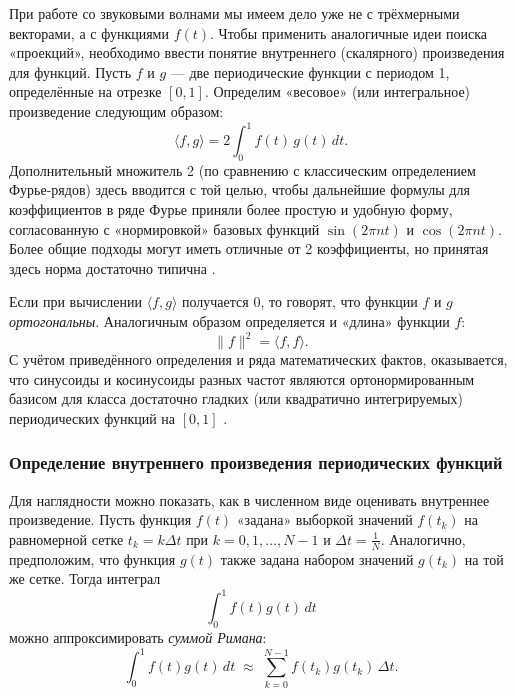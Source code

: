 \documentclass[bachelor, och, diploma]{SCWorks}
\begin{document}
При работе со звуковыми волнами мы имеем дело уже не с трёхмерными векторами, а с функциями \(f(t)\). Чтобы применить аналогичные идеи поиска «проекций», необходимо ввести понятие внутреннего (скалярного) произведения для функций. Пусть \(f\) и \(g\) — две периодические функции с периодом 1, определённые на отрезке \([0,1]\). Определим «весовое» (или интегральное) произведение следующим образом:
\[
\langle f, g \rangle = 2 \int_{0}^{1} f(t)\, g(t)\, dt.
\]
Дополнительный множитель 2 (по сравнению с классическим определением Фурье-рядов) здесь вводится с той целью, чтобы дальнейшие формулы для коэффициентов в ряде Фурье приняли более простую и удобную форму, согласованную с «нормировкой» базовых функций \(\sin(2\pi n t)\) и \(\cos(2\pi n t)\). Более общие подходы могут иметь отличные от 2 коэффициенты, но принятая здесь норма достаточно типична \cite{bracewell}.

Если при вычислении \(\langle f, g\rangle\) получается 0, то говорят, что функции \(f\) и \(g\) \textit{ортогональны}. Аналогичным образом определяется и «длина» функции \(f\):
\[
\| f\|^2 = \langle f, f\rangle.
\]
С учётом приведённого определения и ряда математических фактов, оказывается, что синусоиды и косинусоиды разных частот являются ортонормированным базисом для класса достаточно гладких (или квадратично интегрируемых) периодических функций на \([0,1]\) \cite{opp-sigsys}.

\subsubsection{Определение внутреннего произведения периодических функций}

Для наглядности можно показать, как в численном виде оценивать внутреннее произведение. Пусть функция \(f(t)\) «задана» выборкой значений \(f(t_k)\) на равномерной сетке \(t_k = k\Delta t\) при \(k = 0, 1, \ldots, N-1\) и \(\Delta t = \frac{1}{N}\). Аналогично, предположим, что функция \(g(t)\) также задана набором значений \(g(t_k)\) на той же сетке. Тогда интеграл
\[
\int_{0}^{1} f(t) g(t) \, dt
\]
можно аппроксимировать \textit{суммой Римана}:
\[
\int_{0}^{1} f(t) g(t) \, dt 
\;\approx\; 
\sum_{k=0}^{N-1} f(t_k) g(t_k) \, \Delta t.
\]

\end{document}
